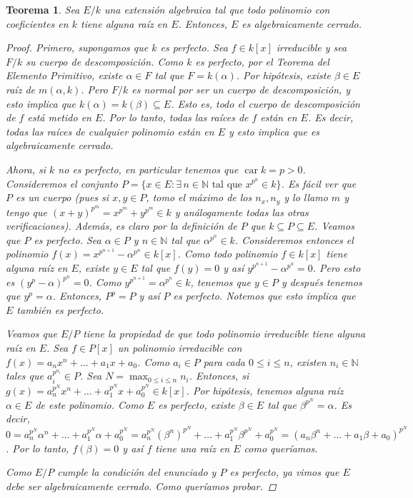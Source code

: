 \documentclass[12pt]{book}
\newtheorem{teo}{Teorema}[section]
\theoremstyle{definition}
\newcommand{\NN}{\mathbb{N}}
\DeclareMathOperator{\car}{car}
\begin{document}
\begin{teo}
Sea $E/k$ una extensión algebraica tal que todo polinomio con coeficientes en $k$ tiene alguna raíz en $E$. Entonces, $E$ es algebraicamente cerrado.
\begin{proof}
Primero, supongamos que $k$ es perfecto. Sea $f\in k[x]$ irreducible y sea $F/k$ su cuerpo de descomposición. Como $k$ es perfecto, por el Teorema del Elemento Primitivo, existe $\alpha\in F$ tal que $F=k(\alpha)$. Por hipótesis, existe $\beta\in E$ raíz de $m(\alpha,k)$. Pero $F/k$ es normal por ser un cuerpo de descomposición, y esto implica que $k(\alpha)=k(\beta)\subseteq E$. Esto es, todo el cuerpo de descomposición de $f$ está metido en $E$. Por lo tanto, todas las raíces de $f$ están en $E$. Es decir, todas las raíces de cualquier polinomio están en $E$ y esto implica que es algebraicamente cerrado.

Ahora, si $k$ no es perfecto, en particular tenemos que $\car k = p>0$. Consideremos el conjunto $P = \{x\in E : \exists\, n\in\NN \text{ tal que } x^{p^n}\in k\}$. Es fácil ver que $P$ es un cuerpo (pues si $x,y\in P$, tomo el máximo de los $n_x,n_y$ y lo llamo $m$ y tengo que $(x+y)^{p^m} = x^{p^m}+y^{p^m}\in k$ y análogamente todas las otras verificaciones). Además, es claro por la definición de $P$ que $k\subseteq P\subseteq E$. Veamos que $P$ es perfecto. Sea $\alpha\in P$ y $n\in\NN$ tal que $\alpha^{p^n}\in k$. Consideremos entonces el polinomio $f(x)=x^{p^{n+1}}-\alpha^{p^n}\in k[x]$. Como todo polinomio $f\in k[x]$ tiene alguna raíz en $E$, existe $y\in E$ tal que $f(y)=0$ y así $y^{p^{n+1}}-\alpha^{p^n}=0$. Pero esto es $(y^p - \alpha)^{p^n} = 0$. Como $y^{p^{n+1}} = \alpha^{p^n}\in k$, tenemos que $y\in P$ y después tenemos que $y^p = \alpha$. Entonces, $P^p = P$ y así $P$ es perfecto. Notemos que esto implica que $E$ también es perfecto.

Veamos que $E/P$ tiene la propiedad de que todo polinomio irreducible tiene alguna raíz en $E$. Sea $f\in P[x]$ un polinomio irreducible con $f(x) = a_n x^n + \ldots + a_1x+a_0$. Como $a_i\in P$ para cada $0\leq i\leq n$, existen $n_i\in\NN$ tales que $a_i^{p^{n_i}}\in P$. Sea $N = \max_{0\leq i\leq n} n_i$. Entonces, si $g(x) = a_n^{p^N} x^n +\ldots + a_1^{p^N}x + a_0^{p^N}\in k[x]$. Por hipótesis, tenemos alguna raíz $\alpha\in E$ de este polinomio. Como $E$ es perfecto, existe $\beta\in E$ tal que $\beta^{p^N}=\alpha$. Es decir, $0=a_n^{p^N} \alpha^n + \ldots + a_1^{p^N} \alpha + a_0^{p^N} = a_n^{p^N}(\beta^n)^{p^N} + \ldots + a_1^{p^N} \beta^{p^N} + a_0^{p^N} = (a_n \beta^n + \ldots + a_1\beta + a_0)^{p^N}$. Por lo tanto, $f(\beta)=0$ y así $f$ tiene una raíz en $E$ como queríamos.

Como $E/P$ cumple la condición del enunciado y $P$ es perfecto, ya vimos que $E$ debe ser algebraicamente cerrado. Como queríamos probar.
\end{proof}
\end{teo}
\end{document}
